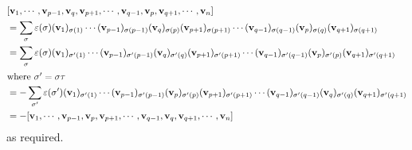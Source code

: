 \begin{align*}
	 & [\vb v_1, \cdots, \vb v_{p-1}, \vb v_q, \vb v_{p+1}, \cdots, \vb v_{q-1}, \vb v_p, \vb v_{q+1}, \cdots, \vb v_n]                                                                                                                          \\
	 & = \sum_\sigma \varepsilon(\sigma) (\vb v_1)_{\sigma(1)} \cdots (\vb v_{p-1})_{\sigma(p-1)}(\vb v_q)_{\sigma(p)}(\vb v_{p+1})_{\sigma(p+1)} \cdots (\vb v_{q-1})_{\sigma(q-1)}(\vb v_p)_{\sigma(q)}(\vb v_{q+1})_{\sigma(q+1)}             \\
	 & = \sum_\sigma \varepsilon(\sigma) (\vb v_1)_{\sigma'(1)} \cdots (\vb v_{p-1})_{\sigma'(p-1)}(\vb v_q)_{\sigma'(q)}(\vb v_{p+1})_{\sigma'(p+1)} \cdots (\vb v_{q-1})_{\sigma'(q-1)}(\vb v_p)_{\sigma'(p)}(\vb v_{q+1})_{\sigma'(q+1)}      \\
	\intertext{where \(\sigma' = \sigma\tau\)}
	 & = -\sum_{\sigma'} \varepsilon(\sigma') (\vb v_1)_{\sigma'(1)} \cdots (\vb v_{p-1})_{\sigma'(p-1)}(\vb v_p)_{\sigma'(p)}(\vb v_{p+1})_{\sigma'(p+1)} \cdots (\vb v_{q-1})_{\sigma'(q-1)}(\vb v_q)_{\sigma'(q)}(\vb v_{q+1})_{\sigma'(q+1)} \\
	 & = -[\vb v_1, \cdots, \vb v_{p-1}, \vb v_p, \vb v_{p+1}, \cdots, \vb v_{q-1}, \vb v_q, \vb v_{q+1}, \cdots, \vb v_n]
\end{align*}
as required.

